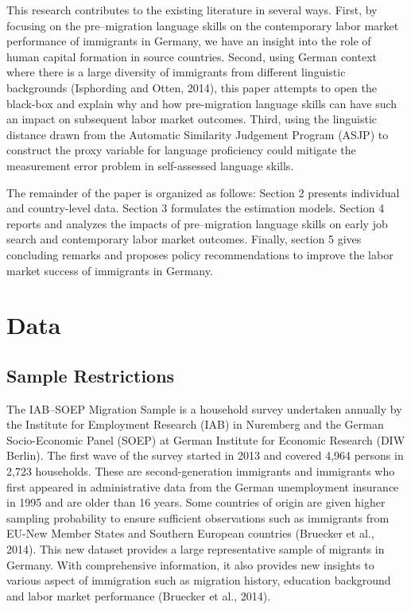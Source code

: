 \documentclass[12pt,a4paper]{article}
\begin{document}
This research contributes to the existing literature in several ways. First, by focusing on the pre--migration language skills on the contemporary labor market performance of immigrants in Germany, we have an insight into the role of human capital formation in source countries. Second, using German context where there is a large diversity of immigrants from different linguistic backgrounds (Isphording and Otten, 2014), this paper attempts to open the black-box and explain why and how pre-migration language skills can have such an impact on subsequent labor market outcomes. Third, using the linguistic distance drawn from the Automatic Similarity Judgement Program (ASJP) to construct the proxy variable for language proficiency could mitigate the measurement error problem in self-assessed language skills.

The remainder of the paper is organized as follows: Section 2 presents individual and country-level data. Section 3 formulates the estimation models. Section 4 reports and analyzes the impacts of pre--migration language skills on early job search and contemporary labor market outcomes. Finally, section 5 gives concluding remarks and proposes policy recommendations to improve the labor market success of immigrants in Germany.

\section{Data}
\subsection{Sample Restrictions}

The IAB--SOEP Migration Sample is a household survey undertaken annually by the Institute for Employment Research (IAB) in Nuremberg and the German Socio-Economic Panel (SOEP) at German Institute for Economic Research (DIW Berlin). The first wave of the survey started in 2013 and covered 4,964 persons in 2,723 households. These are second-generation immigrants and immigrants who first appeared in administrative data from the German unemployment insurance in 1995 and are older than 16 years. Some countries of origin are given higher sampling probability to ensure sufficient observations such as immigrants from EU-New Member States and Southern European countries (Bruecker et al., 2014). This new dataset provides a large representative sample of migrants in Germany. With comprehensive information, it also provides new insights to various aspect of immigration such as migration history, education background and labor market performance (Bruecker et al., 2014).
\end{document}
